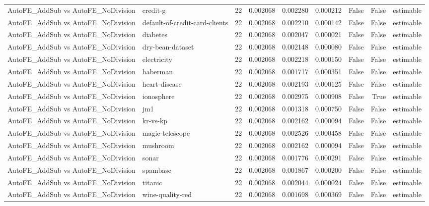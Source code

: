 \begin{table}
\begin{tabular}{llrrrrrrl}
AutoFE\_AddSub vs AutoFE\_NoDivision & credit-g & 22 & 0.002068 & 0.002280 & 0.000212 & False & False & estimable \\
AutoFE\_AddSub vs AutoFE\_NoDivision & default-of-credit-card-clients & 22 & 0.002068 & 0.002210 & 0.000142 & False & False & estimable \\
AutoFE\_AddSub vs AutoFE\_NoDivision & diabetes & 22 & 0.002068 & 0.002047 & 0.000021 & False & False & estimable \\
AutoFE\_AddSub vs AutoFE\_NoDivision & dry-bean-dataset & 22 & 0.002068 & 0.002148 & 0.000080 & False & False & estimable \\
AutoFE\_AddSub vs AutoFE\_NoDivision & electricity & 22 & 0.002068 & 0.002218 & 0.000150 & False & False & estimable \\
AutoFE\_AddSub vs AutoFE\_NoDivision & haberman & 22 & 0.002068 & 0.001717 & 0.000351 & False & False & estimable \\
AutoFE\_AddSub vs AutoFE\_NoDivision & heart-disease & 22 & 0.002068 & 0.002193 & 0.000125 & False & False & estimable \\
AutoFE\_AddSub vs AutoFE\_NoDivision & ionosphere & 22 & 0.002068 & 0.002975 & 0.000908 & False & True & estimable \\
AutoFE\_AddSub vs AutoFE\_NoDivision & jm1 & 22 & 0.002068 & 0.001318 & 0.000750 & False & False & estimable \\
AutoFE\_AddSub vs AutoFE\_NoDivision & kr-vs-kp & 22 & 0.002068 & 0.002162 & 0.000094 & False & False & estimable \\
AutoFE\_AddSub vs AutoFE\_NoDivision & magic-telescope & 22 & 0.002068 & 0.002526 & 0.000458 & False & False & estimable \\
AutoFE\_AddSub vs AutoFE\_NoDivision & mushroom & 22 & 0.002068 & 0.002162 & 0.000094 & False & False & estimable \\
AutoFE\_AddSub vs AutoFE\_NoDivision & sonar & 22 & 0.002068 & 0.001776 & 0.000291 & False & False & estimable \\
AutoFE\_AddSub vs AutoFE\_NoDivision & spambase & 22 & 0.002068 & 0.001867 & 0.000200 & False & False & estimable \\
AutoFE\_AddSub vs AutoFE\_NoDivision & titanic & 22 & 0.002068 & 0.002044 & 0.000024 & False & False & estimable \\
AutoFE\_AddSub vs AutoFE\_NoDivision & wine-quality-red & 22 & 0.002068 & 0.001698 & 0.000369 & False & False & estimable \\
\bottomrule
\end{tabular}
\end{table}
